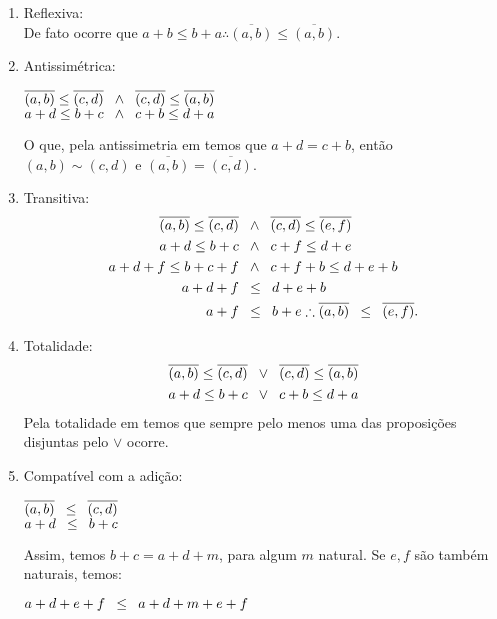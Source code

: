 \documentclass[../main.tex]{subfiles}
\begin{document}
\begin{dem}
    \begin{enumerate}[label=(\roman*)]
        \item Reflexiva: \\
            De fato ocorre que $a+b \leq b+a \therefore \overline{(a,b)} \leq \overline{(a,b)}$.
        
        \item Antissimétrica: 
            \begin{center}
                $\overline{(a,b)} \leq \overline{(c,d)} \hspace{8pt} {\land} \hspace{8pt} \overline{(c,d)} \leq \overline{(a,b)}$ \\
                $a+d \leq b+c \hspace{8pt} {\land} \hspace{8pt} c+b \leq d+a$
            \end{center}
            O que, pela antissimetria em \N temos que $a+d = c+b$, então $(a,b) \sim (c,d)$ e $\overline{(a,b)} = \overline{(c,d)} $.
        
        \item Transitiva: 
        \begin{align*}
            \overline{(a,b)} \leq \overline{(c,d)} & \hspace{8pt} {\land} \hspace{8pt} \overline{(c,d)} \leq \overline{(e,f)}  \\
            a+d \leq b+c & \hspace{8pt} {\land} \hspace{8pt} c+f \leq d+e  \\
            a+d+f \leq b + c + f & \hspace{8pt} {\land} \hspace{8pt} c + f + b \leq d + e + b  \\
            a + d + f & \hspace{8pt} {\leq} \hspace{8pt} d + e + b \\
            a + f & \hspace{8pt} {\leq} \hspace{8pt} b + e 
            \therefore \overline{(a,b)}  \hspace{8pt} {\leq} \hspace{8pt} \overline{(e,f)}.
        \end{align*}
            
        \item Totalidade: 
        \begin{align*}
            \overline{(a,b)} \leq \overline{(c,d)} & \hspace{8pt} {\lor} \hspace{8pt} \overline{(c,d)} \leq \overline{(a,b)} \\ 
            a+d \leq b+c & \hspace{8pt} {\lor} \hspace{8pt} c+b \leq d+a   
        \end{align*}
        Pela totalidade em \N temos que sempre pelo menos uma das proposições disjuntas pelo $\lor$ ocorre.
        
        \item Compatível com a adição: \\
        \begin{center}
            $\overline{(a,b)} \hspace{8pt} {\leq} \hspace{8pt} \overline{(c,d)}$ \\
            $a+d \hspace{8pt} {\leq} \hspace{8pt} b+c$ 
        \end{center}
            Assim, temos $b+c = a+d + m$, para algum $m$ natural. Se $e, f$ são também naturais, temos: \\
        \begin{center}    
           $a+d+e+f \hspace{8pt} {\leq} \hspace{8pt} a+d+m+e+f$ \\


\end{center}
\end{enumerate}
\end{dem}
\end{document}
